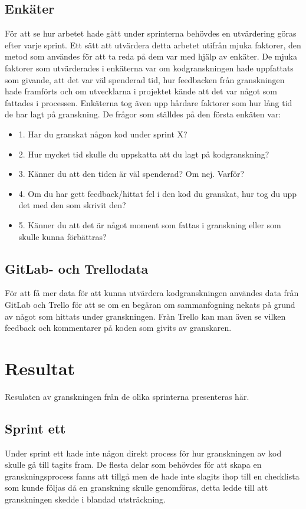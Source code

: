 \subsection{Enkäter}
För att se hur arbetet hade gått under sprinterna behövdes en utvärdering göras efter varje sprint. Ett sätt att utvärdera detta arbetet utifrån mjuka faktorer, den metod som användes för att ta reda på dem var med hjälp av enkäter. De mjuka faktorer som utvärderades i enkäterna var om kodgranskningen hade uppfattats som givande, att det var väl spenderad tid, hur feedbacken från granskningen hade framförts och om utvecklarna i projektet kände att det var något som fattades i processen. Enkäterna tog även upp hårdare faktorer som hur lång tid de har lagt på granskning. De frågor som ställdes på den första enkäten var:
\begin{itemize}
\item 1. Har du granskat någon kod under sprint X?
\item 2. Hur mycket tid skulle du uppskatta att du lagt på kodgranskning?
\item 3. Känner du att den tiden är väl spenderad? Om nej. Varför?
\item 4. Om du har gett feedback/hittat fel i den kod du granskat, hur tog du upp det med den som skrivit den?
\item 5. Känner du att det är något moment som fattas i granskning eller som skulle kunna förbättras?
\end{itemize}
\subsection{GitLab- och Trellodata}
För att få mer data för att kunna utvärdera kodgranskningen användes data från GitLab och Trello för att se om en begäran om sammanfogning nekats på grund av något som hittats under granskningen. Från Trello kan man även se vilken feedback och kommentarer på koden som givits av granskaren.
\section{Resultat}
\label{sec:victor-results}
Resulaten av granskningen från de olika sprinterna presenteras här. 
\subsection{Sprint ett}
Under sprint ett hade inte någon direkt process för hur granskningen av kod skulle gå till tagits fram. De flesta delar som behövdes för att skapa en granskningsprocess fanns att tillgå men de hade inte slagits ihop till en checklista som kunde följas då en granskning skulle genomföras, detta ledde till att granskningen skedde i blandad utsträckning.
